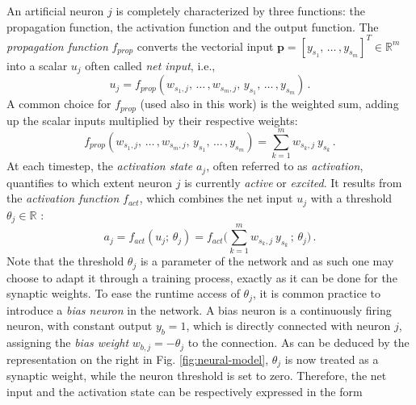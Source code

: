 \documentclass{elsarticle}
\numberwithin{equation}{section}
\theoremstyle{theorem}
\theoremstyle{definition}
\theoremstyle{remark}
\theoremstyle{proposition}
\numberwithin{figure}{section}
\begin{document}
		An artificial neuron $j$ is completely characterized by three functions: the propagation function, the activation function and the output function. The \emph{propagation function} $f_{prop}$ converts the vectorial input $\mathbf{p} = [y_{s_1}, \, \ldots \, , y_{s_m}]^T \in \mathbb{R}^m$ into a scalar $u_{j}$ often called \emph{net input}, i.e.,
		\begin{equation*}
			\label{eq:propagation-function}
			u_{j} = f_{prop}(w_{s_1,j}, \, \ldots \, , w_{s_m,j}, \, y_{s_1}, \, \ldots \, , y_{s_m}) \, .
		\end{equation*}
		A common choice for $f_{prop}$ (used also in this work) is the weighted sum, adding up the scalar inputs multiplied by their respective weights:
		\begin{equation*}
			\label{eq:weighted-sum}
			f_{prop}(w_{s_1,j}, \, \ldots \, , w_{s_m,j}, \, y_{s_1}, \, \ldots \, , y_{s_m}) = \sum_{k = 1}^m w_{s_k,j} ~ y_{s_k} \, .
		\end{equation*} 
		At each timestep, the \emph{activation state} $a_j$, often referred to as \emph{activation}, quantifies to which extent neuron $j$ is currently \emph{active} or \emph{excited}. It results from the \emph{activation function} $f_{act}$, which combines the net input $u_j$ with a threshold $\theta_j \in \mathbb{R}$ \cite{Kri07}: 
		\begin{equation*}
			\label{eq:activation-function}
			a_j = f_{act}(u_j; \, \theta_j) = f_{act} \big( \sum_{k = 1}^m w_{s_k,j} ~ y_{s_k} \, ; \, \theta_j \big) \, .
		\end{equation*}
		Note that the threshold $\theta_j$ is a parameter of the network and as such one may choose to adapt it through a training process, exactly as it can be done for the synaptic weights. To ease the runtime access of $\theta_j$, it is common practice to introduce a \emph{bias neuron} in the network. A bias neuron is a continuously firing neuron, with constant output $y_{b} = 1$, which is directly connected with neuron $j$, assigning the \emph{bias weight} $w_{b,j} = - \theta_j$ to the connection. As can be deduced by the representation on the right in Fig. \ref{fig:neural-model}, $\theta_j$ is now treated as a synaptic weight, while the neuron threshold is set to zero. Therefore, the net input and the activation state can be respectively expressed in the form
\end{document}
